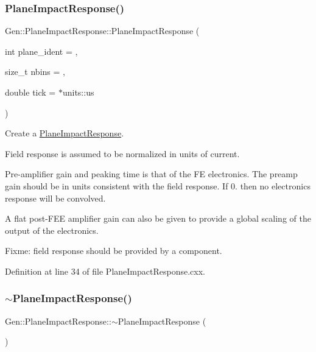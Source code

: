 \subsubsection{\texorpdfstring{Plane\+Impact\+Response()}{PlaneImpactResponse()}}
{\footnotesize\ttfamily Gen\+::\+Plane\+Impact\+Response\+::\+Plane\+Impact\+Response (\begin{DoxyParamCaption}\item[{int}]{plane\+\_\+ident = {},  }\item[{size\+\_\+t}]{nbins = {},  }\item[{double}]{tick = {$\ast$units\+:\+:us} }\end{DoxyParamCaption})}

Create a \hyperlink{class_wire_cell_1_1_gen_1_1_plane_impact_response}{Plane\+Impact\+Response}.

Field response is assumed to be normalized in units of current.

Pre-\/amplifier gain and peaking time is that of the FE electronics. The preamp gain should be in units consistent with the field response. If 0. then no electronics response will be convolved.

A flat post-\/\+F\+EE amplifier gain can also be given to provide a global scaling of the output of the electronics.

Fixme\+: field response should be provided by a component. 

Definition at line 34 of file Plane\+Impact\+Response.\+cxx.

\mbox{\label{class_wire_cell_1_1_gen_1_1_plane_impact_response_a3d10a9817c3f150e03b72181bea818c1}} 
\subsubsection{\texorpdfstring{$\sim$\+Plane\+Impact\+Response()}{~PlaneImpactResponse()}}
{\footnotesize\ttfamily Gen\+::\+Plane\+Impact\+Response\+::$\sim$\+Plane\+Impact\+Response (\begin{DoxyParamCaption}{ }\end{DoxyParamCaption})}



